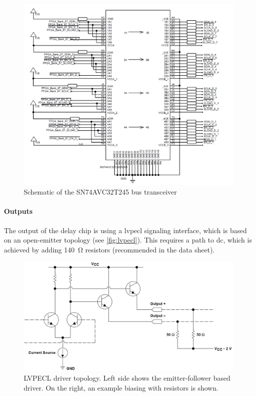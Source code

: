 \begin{figure}[tbh]
	\centering
	\includegraphics[width = \textwidth]{chap/04-theresa/img/schematic/level_trans}
	\caption[SN74AVC32T245 bus transceiver]{Schematic of the SN74AVC32T245 bus transceiver}
	\label{fig:level_trans}
\end{figure}

\paragraph{Outputs}
The output of the delay chip is using a \gls{lvpecl} signaling interface, which is based on an open-emitter topology (see \autoref{fig:lvpecl}).
This requires a path to \gls{dc}, which is achieved by adding \SI{140}{\ohm} resistors (recommended in the data sheet).

\begin{figure}[tbh]
	\centering
	\includegraphics[width = \textwidth]{chap/04-theresa/img/lvpecl}
	\caption[LVPECL driver topology]{LVPECL driver topology. Left side shows the emitter-follower based driver. On the right, an example biasing with resistors is shown. \cite{lvpecl}}
	\label{fig:lvpecl}
\end{figure}

